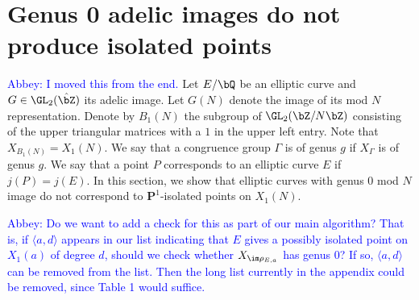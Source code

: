 \documentclass[11pt,reqno]{amsart}
\theoremstyle{plain}
\newtheorem{theorem}{Theorem}%
\theoremstyle{definition}
\newcommand{\Q}{\bQ}
\newcommand{\Z}{\bZ}
\newcommand{\PP}{\mathbf P}
\newcommand{\abbey}[1]{\textcolor{blue}{Abbey: #1}}
\newcommand{\timo}[1]{\textcolor{red}{Timo: #1}}
\newcommand{\sedit}[1]{{\color{purple} #1}}
\begin{document}


\section{Genus 0 adelic images do not produce isolated points}
\label{sec:genus0images}

\abbey{I moved this from the end.}
\label{sec:genus0}
Let $E/\Q$ be an elliptic curve and $G\in \GL_2(\hat \Z)$ its adelic image. Let $G(N)$ denote the image of its mod $N$ representation. Denote by $B_1(N)$ the subgroup of $\GL_2(\Z/N\Z)$ consisting of the upper triangular matrices with a $1$ in the upper left entry. Note that $X_{B_1(N)}=X_1(N)$. We say that a congruence group $\Gamma$ is of genus $g$ if $X_\Gamma$ is of genus $g$. We say that a point $P$ corresponds to an elliptic curve $E$ if $j(P)=j(E)$. \sedit{In this section, we show that elliptic curves with genus $0$ mod $N$ image  do not correspond to $\PP^1$-isolated points on $X_1(N)$.}

\abbey{Do we want to add a check for this as part of our main algorithm? That is, if $\langle a, d\rangle$ appears in our list indicating that $E$ gives a possibly isolated point on $X_1(a)$ of degree $d$, should we check whether $X_{\im \rho_{E,a}}$ has genus 0? If so, $\langle a, d\rangle$ can be removed from the list. Then the long list currently in the appendix could be removed, since Table 1 would suffice.}
\end{document}
